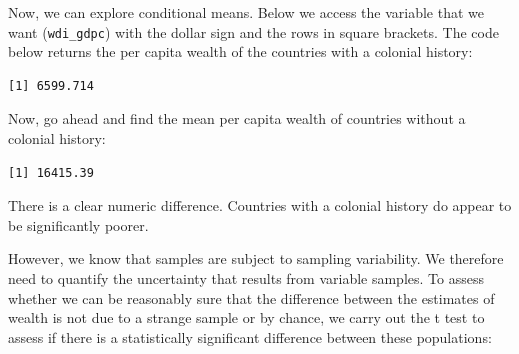 \documentclass[]{article}
\newenvironment{Shaded}{\begin{snugshade}}{\end{snugshade}}
\newcommand{\DataTypeTok}[1]{\textcolor[rgb]{0.13,0.29,0.53}{#1}}
\newcommand{\DecValTok}[1]{\textcolor[rgb]{0.00,0.00,0.81}{#1}}
\newcommand{\FloatTok}[1]{\textcolor[rgb]{0.00,0.00,0.81}{#1}}
\newcommand{\KeywordTok}[1]{\textcolor[rgb]{0.13,0.29,0.53}{\textbf{#1}}}
\newcommand{\NormalTok}[1]{#1}
\newcommand{\OperatorTok}[1]{\textcolor[rgb]{0.81,0.36,0.00}{\textbf{#1}}}
\newcommand{\OtherTok}[1]{\textcolor[rgb]{0.56,0.35,0.01}{#1}}
\newcommand{\StringTok}[1]{\textcolor[rgb]{0.31,0.60,0.02}{#1}}
\begin{document}
Now, we can explore conditional means. Below we access the variable that we want (\texttt{wdi\_gdpc}) with the dollar sign and the rows in square brackets. The code below returns the per capita wealth of the countries with a colonial history:

\begin{Shaded}
\end{Shaded}

\begin{verbatim}
[1] 6599.714
\end{verbatim}

Now, go ahead and find the mean per capita wealth of countries without a colonial history:

\begin{Shaded}
\end{Shaded}

\begin{verbatim}
[1] 16415.39
\end{verbatim}

There is a clear numeric difference. Countries with a colonial history do appear to be significantly poorer.

However, we know that samples are subject to sampling variability. We therefore need to quantify the uncertainty that results from variable samples. To assess whether we can be reasonably sure that the difference between the estimates of wealth is not due to a strange sample or by chance, we carry out the t test to assess if there is a statistically significant difference between these populations:

\begin{Shaded}
\end{Shaded}
\end{document}
